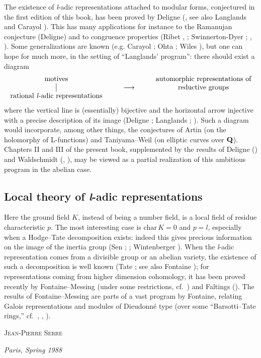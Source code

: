 The existence of \textit{l}-adic representations attached to modular
forms, conjectured in the first edition of this book, has been proved by
Deligne (\cite{deligne-formes}, see also Langlands \cite{langlands-modular}
and Carayol \cite{carayol}). This has many applications for instance to the
Ramanujan conjecture (Deligne) and to congruence properties (Ribet
\cite{ribet-ladic}, \cite{ribet-nebentypus}; Swinnerton-Dyer \cite{swd};
\cite{serre-ramanujan}, \cite{serre-congruences}). Some generalizations are
known (e.g. Carayol \cite{carayol}; Ohta \cite{ohta}; Wiles \cite{wiles}),
but one can hope for much more, in the setting of ``Langlands' program'':
there should exist a diagram
\[
\begin{array}{c@{\hspace{3em}}c@{\hspace{3em}}c}
\text{motives} & & \text{automorphic representations of}\\
\big\vert & \longrightarrow & \text{reductive groups}\\[0.15\baselineskip]
\text{rational \textit{l}-adic representations} &
\end{array}
\]
where the vertical line is (essentially) bijective and the horizontal arrow
injective with a precise description of its image (Deligne
\cite{deligne-valeurs}; Langlands \cite{langlands-automorphic};
\cite{serre-kyoto}). Such a diagram would incorporate, among other things,
the conjectures of Artin (on the holomorphy of L-functions) and
Taniyama--Weil (on elliptic curves over $\mathbf{Q}$). Chapters II and III of the
present book, supplemented by the results of Deligne (\cite{deligne-motifs})
and Waldschmidt (\cite{henniart}, \cite{waldschmidt}), may be viewed as
a partial realization of this ambitious program in the abelian case.

\subsection*{\normalfont\bfseries Local theory of \textit{l}-adic representations}

Here the ground field $K$, instead of being a number field, is a local
field of residue characteristic $p$. The most interesting case is
$\mathrm{char}\,K=0$ and $p=l$, especially when a Hodge--Tate decomposition
exists: indeed this gives precious information on the image of the inertia
group (Sen \cite{sen}; \cite{serre-hodgetate}; Wintenberger
\cite{wintenberger}). When the \textit{l}-adic representation comes from a
divisible group or an abelian variety, the existence of such a
decomposition is well known (Tate \cite{tate-pdiv}; see also Fontaine
\cite{fontaine-tatemod}); for representations coming from higher dimension
cohomology, it has been proved recently by Fontaine--Messing (under some
restrictions, cf.~\cite{fontaine-messing}) and Faltings
(\cite{faltings-hodge}). The results of Fontaine--Messing are parts of a
vast program by Fontaine, relating Galois representations and modules of
Dieudonné type (over some ``Barsotti--Tate rings,'' cf.~\cite{fontaine-galmod},
\cite{fontaine-barsotti}, \cite{fontaine-repp}).

\medskip
\hfill \textsc{Jean-Pierre Serre}

\medskip
\hfill \textit{Paris, Spring 1988}
